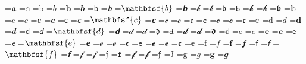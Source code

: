 \documentclass{article}
\begin{document}
=\hbox{$\mathbffrak{a}$}
=\hbox{$\mathbb{a}$}
=\hbox{$\mathrm{b}$}
=\hbox{$\mathit{b}$}
=\hbox{$\mathbf{b}$}
=\hbox{$\mathbfit{b}$}
=\hbox{$\mathsf{b}$}
=\hbox{$\mathsfit{b}$}
=\hbox{$\mathbfsf{b}$}
=\hbox{$\mathbfsfit{b}$}
=\hbox{$\mathcal{b}$}
=\hbox{$\mathscr{b}$}
=\hbox{$\mathfrak{b}$}
=\hbox{$\mathtt{b}$}
=\hbox{$\mathbfcal{b}$}
=\hbox{$\mathbfscr{b}$}
=\hbox{$\mathbffrak{b}$}
=\hbox{$\mathbb{b}$}
=\hbox{$\mathrm{c}$}
=\hbox{$\mathit{c}$}
=\hbox{$\mathbf{c}$}
=\hbox{$\mathbfit{c}$}
=\hbox{$\mathsf{c}$}
=\hbox{$\mathsfit{c}$}
=\hbox{$\mathbfsf{c}$}
=\hbox{$\mathbfsfit{c}$}
=\hbox{$\mathcal{c}$}
=\hbox{$\mathscr{c}$}
=\hbox{$\mathfrak{c}$}
=\hbox{$\mathtt{c}$}
=\hbox{$\mathbfcal{c}$}
=\hbox{$\mathbfscr{c}$}
=\hbox{$\mathbffrak{c}$}
=\hbox{$\mathbb{c}$}
=\hbox{$\mathrm{d}$}
=\hbox{$\mathit{d}$}
=\hbox{$\mathbf{d}$}
=\hbox{$\mathbfit{d}$}
=\hbox{$\mathsf{d}$}
=\hbox{$\mathsfit{d}$}
=\hbox{$\mathbfsf{d}$}
=\hbox{$\mathbfsfit{d}$}
=\hbox{$\mathcal{d}$}
=\hbox{$\mathscr{d}$}
=\hbox{$\mathfrak{d}$}
=\hbox{$\mathtt{d}$}
=\hbox{$\mathbfcal{d}$}
=\hbox{$\mathbfscr{d}$}
=\hbox{$\mathbffrak{d}$}
=\hbox{$\mathbb{d}$}
=\hbox{$\mathrm{e}$}
=\hbox{$\mathit{e}$}
=\hbox{$\mathbf{e}$}
=\hbox{$\mathbfit{e}$}
=\hbox{$\mathsf{e}$}
=\hbox{$\mathsfit{e}$}
=\hbox{$\mathbfsf{e}$}
=\hbox{$\mathbfsfit{e}$}
=\hbox{$\mathcal{e}$}
=\hbox{$\mathscr{e}$}
=\hbox{$\mathfrak{e}$}
=\hbox{$\mathtt{e}$}
=\hbox{$\mathbfcal{e}$}
=\hbox{$\mathbfscr{e}$}
=\hbox{$\mathbffrak{e}$}
=\hbox{$\mathbb{e}$}
=\hbox{$\mathrm{f}$}
=\hbox{$\mathit{f}$}
=\hbox{$\mathbf{f}$}
=\hbox{$\mathbfit{f}$}
=\hbox{$\mathsf{f}$}
=\hbox{$\mathsfit{f}$}
=\hbox{$\mathbfsf{f}$}
=\hbox{$\mathbfsfit{f}$}
=\hbox{$\mathcal{f}$}
=\hbox{$\mathscr{f}$}
=\hbox{$\mathfrak{f}$}
=\hbox{$\mathtt{f}$}
=\hbox{$\mathbfcal{f}$}
=\hbox{$\mathbfscr{f}$}
=\hbox{$\mathbffrak{f}$}
=\hbox{$\mathbb{f}$}
=\hbox{$\mathrm{g}$}
=\hbox{$\mathit{g}$}
=\hbox{$\mathbf{g}$}
=\hbox{$\mathbfit{g}$}
\end{document}
